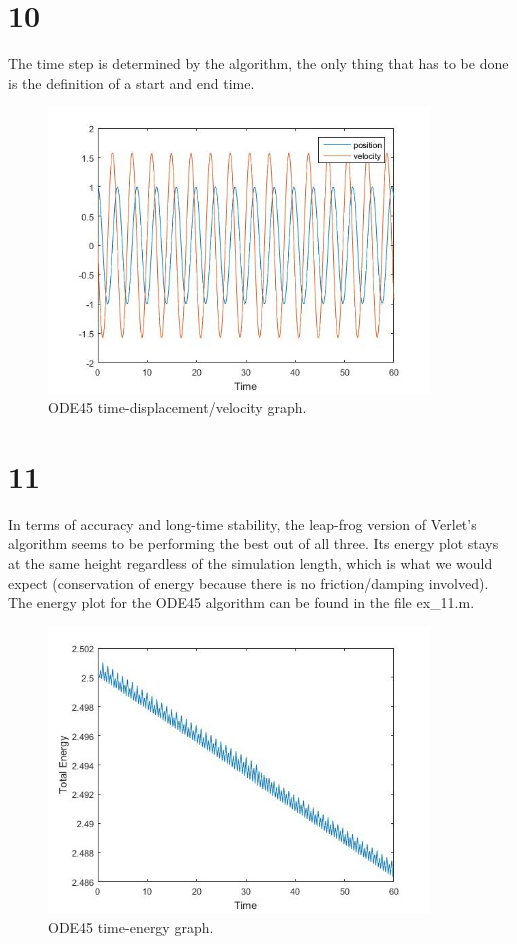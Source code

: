 \documentclass[12pt, a4paper]{article}
\begin{document}
	\part*{10}
	The time step is determined by the algorithm, the only thing that has to be done is the definition of a start and end time.
	\begin{figure}[!ht]
		\centering
		\includegraphics[width=0.9\textwidth]{10}
		\caption{ODE45 time-displacement/velocity graph.}
	\end{figure}
	\newpage
	\part*{11}
	In terms of accuracy and long-time stability, the leap-frog version of Verlet's algorithm seems to be performing the best out of all three. Its energy plot stays at the same height regardless of the simulation length, which is what we would expect (conservation of energy because there is no friction/damping involved). The energy plot for the ODE45 algorithm can be found in the file ex\_11.m.
	\begin{figure}[!ht]
		\centering
		\includegraphics[width=0.9\textwidth]{11}
		\caption{ODE45 time-energy graph.}
	\end{figure}
\end{document}
